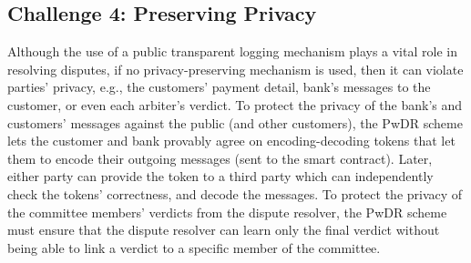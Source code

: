 
\subsection{Challenge 4: Preserving Privacy}
 Although the use of a public transparent logging mechanism plays a vital role in resolving disputes, if no  privacy-preserving mechanism is used, then it can violate parties' privacy, e.g., the customers' payment detail,  bank's messages to the customer, or even each arbiter's verdict. To protect the  privacy of the bank's and customers' messages against the public (and other customers), the PwDR scheme lets the customer and bank provably agree on encoding-decoding tokens that let them to encode their outgoing messages (sent to the smart contract). Later, either party can provide the token to a third party which can independently check the tokens' correctness, and decode the messages. To protect the privacy of the committee members' verdicts from the  dispute resolver, the PwDR scheme must ensure that  the dispute resolver can learn only the final verdict without being able to link a verdict to a specific  member of the committee. 